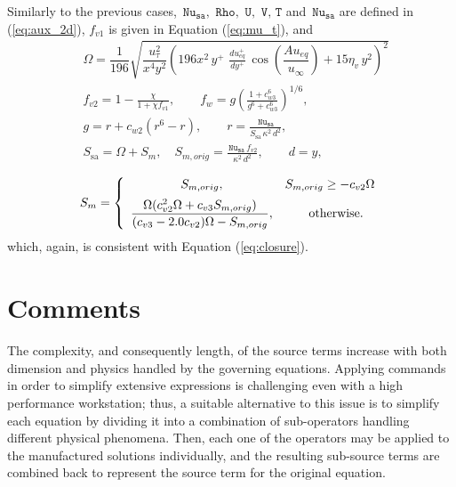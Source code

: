 \documentclass[10pt]{article}
\newcommand{\Rho}{\,\mathtt{Rho}}
\newcommand{\U}{\,\mathtt{U}}
\newcommand{\V}{\,\mathtt{V}}
\newcommand{\Nu}{\,\mathtt{Nu_{sa}}}
\newcommand{\T}{\,\mathtt{T}}
\newcommand{\Dueqplusyplus}{\, \frac{du_{eq}^+}{dy^+}\,}
\begin{document}
\vspace{12pt}
Similarly to the previous cases, $\Nu,\, \Rho,\, \U,\,\V, \T$ and $\Nu$ are defined in (\ref{eq:aux_2d}), $f_{v1}$ is given in  Equation (\ref{eq:mu_t}), and
%
\begin{equation}
 \begin{split}
&\Omega = \dfrac{1}{196} \sqrt{\dfrac{u_{\tau}^2}{x^4 y^2} \left(196 x^2 \, y^{+} \, \Dueqplusyplus \cos\left(\dfrac{A u_{eq}}{u_{\infty}}\right)+15 \eta_v \, y^2\right)^2 } \\
&f_{v2} = 1 - \frac{\chi}{1 + \chi f_{v1}}, \qquad f_w = g \left( \frac{1 + c_{w3}^6}{g^6 + c_{w3}^6} \right)^{1/6}, \quad \\
& g = r + c_{w2} \left( r^6 - r \right), \qquad r = \frac{\Nu}{S_{\mathrm{sa}}\, \kappa^2 \, d^2},\\
&S_{\mathrm{sa}} = \Omega + S_m ,\quad S_{m, orig} = \frac{\Nu \,f_{v2}}{\kappa^2 \, d^2} , \qquad d=y,
\end{split}
\end{equation}

\begin{equation*}
S_m = \left\{ \begin{array}{cc}
S_{m, orig}, & S_{m,orig} \geq -c_{v2} \Omega \vspace{5pt}\\ 
\dfrac{\Omega (c_{v2}^2 \Omega + c_{v3} S_{m,orig})}{ (c_{v3}-2.0c_{v2}) \Omega - S_{m,orig}}, & \quad \mathrm{otherwise}.
\end{array}
\right.
\end{equation*}
which, again, is consistent with Equation (\ref{eq:closure}). 

\section{Comments}
The complexity, and consequently length, of the source terms increase with both dimension and physics handled by the governing equations. 
Applying commands in order to simplify extensive expressions is challenging even with a high performance workstation; thus, a suitable alternative to this issue is to simplify each equation by dividing it into a combination of sub-operators handling different physical phenomena. Then, each one of the operators may be applied to the manufactured solutions individually, and the resulting sub-source terms are combined back to represent the source term for the original equation.
\end{document}
